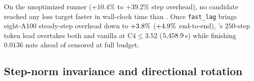 \begin{finding}
On the unoptimized runner ($+10.4\%$ to $+39.2\%$ step overhead), no candidate
reached any loss target faster in wall-clock time than . Once
\texttt{fast\_lag} brings eight-A100 steady-step overhead down to
$+3.8\%$ ($+4.9\%$ end-to-end),
's $250$-step token lead overtakes both  and
vanilla  at $\text{C4}\le 3.52$ ($5{,}458.9$\,s)
while finishing $0.0136$ nats ahead of censored  at full budget.
\end{finding}

\subsection{Step-norm invariance and directional rotation}
\label{sec:mech-graft}

